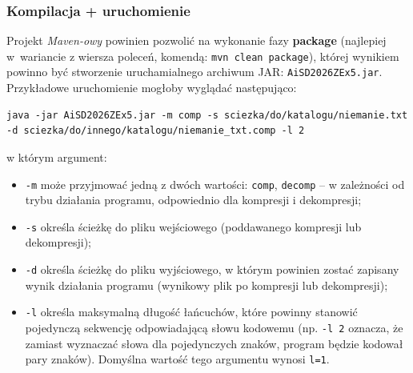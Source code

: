\documentclass[twoside]{article}
\begin{document}
\subsubsection{Kompilacja + uruchomienie}

Projekt \textit{Maven-owy} powinien pozwolić na wykonanie fazy \textbf{package} 
(najlepiej w~wariancie z wiersza poleceń, komendą: \verb|mvn clean package|), której wynikiem
powinno być stworzenie uruchamialnego archiwum JAR: \verb|AiSD2026ZEx5.jar|.\\

Przykładowe uruchomienie mogłoby wyglądać następująco:
\begin{verbatim}
java -jar AiSD2026ZEx5.jar -m comp -s sciezka/do/katalogu/niemanie.txt -d sciezka/do/innego/katalogu/niemanie_txt.comp -l 2
\end{verbatim}

w którym argument:
\begin{itemize}
    \item \verb|-m| może przyjmować jedną z dwóch wartości: \verb|comp|, \verb|decomp| -- w zależności od trybu działania programu, odpowiednio dla kompresji i dekompresji;
    \item \verb|-s| określa ścieżkę do pliku wejściowego (poddawanego kompresji lub dekompresji);
    \item \verb|-d| określa ścieżkę do pliku wyjściowego, w którym powinien zostać zapisany wynik działania programu (wynikowy plik po kompresji lub dekompresji);
    \item \verb|-l| określa maksymalną długość łańcuchów, które powinny stanowić pojedynczą sekwencję odpowiadającą słowu kodowemu (np. \verb|-l 2| oznacza, że zamiast wyznaczać słowa dla pojedynczych znaków, program będzie kodował pary znaków). Domyślna wartość tego argumentu wynosi \verb|l=1|.
\end{itemize}
\end{document}
